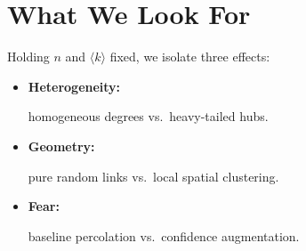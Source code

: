 \documentclass[fleqn]{betterposter}
\begin{document}
{\vspace{-1.5em}
\section{What We Look For}
\vspace{-0.3em}
Holding $n$ and $\langle k\rangle$ fixed, we isolate three effects:
\vspace{0.2em}
\begin{itemize}[leftmargin=*, nosep, itemsep=0.3em]

  \item \textbf{Heterogeneity:}

  homogeneous degrees vs.\ heavy-tailed hubs.

  \item \textbf{Geometry:}

  pure random links vs.\ local spatial clustering.

  \item \textbf{Fear:}

  baseline percolation vs.\ confidence augmentation.

\end{itemize}

\vfill


}{
\raggedright

\vspace{-1.9em}

}
\end{document}
